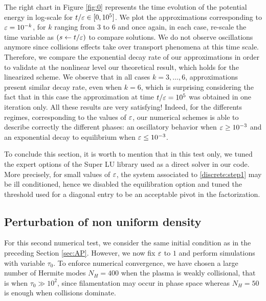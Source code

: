 \documentclass[11pt]{amsart}
\numberwithin{equation}{section}
\numberwithin{figure}{section}
\begin{document}
The right chart in Figure \ref{fig:0} represents the time evolution of
the potential energy in log-scale for $t/\varepsilon\in[0,10^{5}]$. We plot
the approximations corresponding to $\varepsilon=10^{-k}$, for $k$ ranging
from $3$ to $6$ and once again, in each case, re-scale the time
variable as $(s\leftarrow t/\varepsilon)$ to compare solutions. We do not
observe oscillations anymore since collisions effects take over
transport phenomena at this time scale. Therefore, we compare the
exponential decay rate of our approximations in order to validate at
the nonlinear level our theoretical result, which holds for the
linearized scheme. We observe that in all cases $k=3,\dots,6$,
approximations present similar decay rate, even when $k=6$, which is
surprising considering the fact that in this case the approximation at
time $t/\varepsilon=10^{5}$ was obtained in one iteration only. All these
results are  very satisfying! Indeed,  for the
differents regimes, corresponding to the values of $\varepsilon$, our
numerical schemes is able to describe correctly the different phases:
an oscillatory behavior when $\varepsilon\geq 10^{-3}$ and an exponential decay to
equilibrium when $\varepsilon\leq 10^{-3}$.



To conclude this section, it is worth to mention that in this test only, we tuned the expert options of the Super
LU library \cite{superlu} used as a direct solver in our code. More
precisely, for small values of $\varepsilon$, the system associated to
\eqref{discrete:step1} may be ill conditioned, hence we disabled the equilibration option and tuned the threshold used for a diagonal entry to be an acceptable pivot in the factorization. 




\subsection{Perturbation of non uniform density}\label{sec:pert:density}
For this second numerical test, we  consider the same initial
condition as in the preceding Section \ref{sec:AP}. However, we now fix $\varepsilon$ to $1$ and perform simulations with variable $\tau_0$. To enforce numerical convergence, we have chosen a large number of Hermite modes $N_H =400$ when the plasma is weakly
collisional, that is when $\tau_0\gg 10^{2}$, since filamentation may occur in phase
space whereas $N_H=50$ is enough when collisions dominate.
\end{document}
